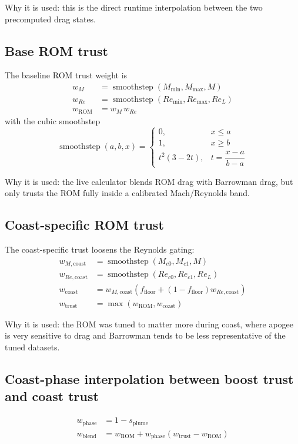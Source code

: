 \documentclass[11pt]{article}
\begin{document}
Why it is used: this is the direct runtime interpolation between the two precomputed drag states.

\subsection{Base ROM trust}
The baseline ROM trust weight is
\begin{align*}
w_M &= \operatorname{smoothstep}(M_{\min}, M_{\max}, M) \\
w_{Re} &= \operatorname{smoothstep}(Re_{\min}, Re_{\max}, Re_L) \\
w_{\mathrm{ROM}} &= w_M\,w_{Re}
\end{align*}
with the cubic smoothstep
\begin{equation*}
\operatorname{smoothstep}(a,b,x)=
\begin{cases}
0, & x \le a \\
1, & x \ge b \\
t^2(3-2t), & t=\dfrac{x-a}{b-a}
\end{cases}
\end{equation*}

Why it is used: the live calculator blends ROM drag with Barrowman drag, but only trusts the ROM fully inside a calibrated Mach/Reynolds band.

\subsection{Coast-specific ROM trust}
The coast-specific trust loosens the Reynolds gating:
\begin{align*}
w_{M,\mathrm{coast}} &= \operatorname{smoothstep}(M_{c0}, M_{c1}, M) \\
w_{Re,\mathrm{coast}} &= \operatorname{smoothstep}(Re_{c0}, Re_{c1}, Re_L) \\
w_{\mathrm{coast}} &= w_{M,\mathrm{coast}}\left(f_{\mathrm{floor}} + (1-f_{\mathrm{floor}})w_{Re,\mathrm{coast}}\right) \\
w_{\mathrm{trust}} &= \max(w_{\mathrm{ROM}}, w_{\mathrm{coast}})
\end{align*}

Why it is used: the ROM was tuned to matter more during coast, where apogee is very sensitive to drag and Barrowman tends to be less representative of the tuned datasets.

\subsection{Coast-phase interpolation between boost trust and coast trust}
\begin{align*}
w_{\mathrm{phase}} &= 1 - s_{\mathrm{plume}} \\
w_{\mathrm{blend}} &= w_{\mathrm{ROM}} + w_{\mathrm{phase}}\left(w_{\mathrm{trust}} - w_{\mathrm{ROM}}\right)
\end{align*}
\end{document}
